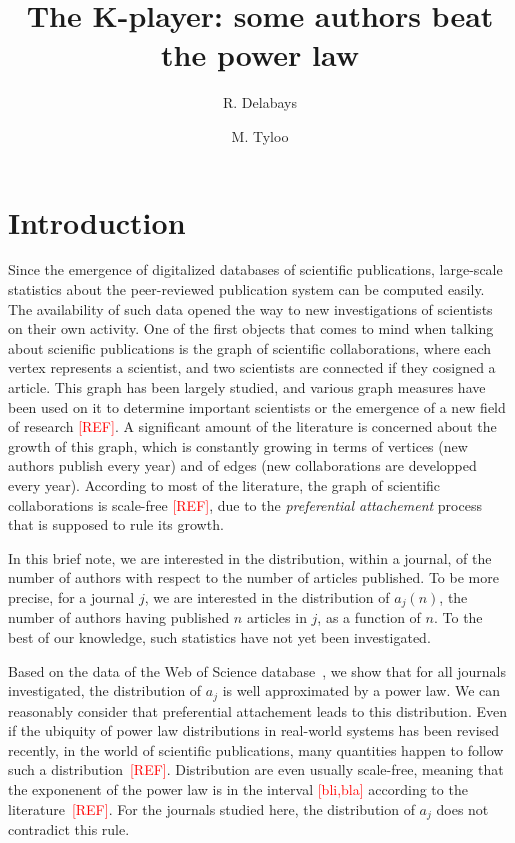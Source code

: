 \documentclass[9pt,twocolumn,twoside]{pnas-new}
\title{The K-player: some authors beat the power law}
\author[a,b,1]{R. Delabays}
\author[a,c]{M. Tyloo}
\affil[a]{School of Engineering, University of Applied Sciences of Western Switzerland HES-SO CH-1951 Sion, Switzerland.}
\affil[b]{Automatic Control Laboratory, Swiss Federal Institute of Technology (ETH) Z\"urich,  Switzerland.}
\affil[c]{Institute of Physics, EPF Lausanne, CH-1015 Lausanne, Switzerland.}
\begin{document}
\maketitle
\thispagestyle{firststyle}

\section{Introduction} 
Since the emergence of digitalized databases of scientific publications, large-scale statistics about the peer-reviewed publication system can be computed easily. 
The availability of such data opened the way to new investigations of scientists on their own activity. 
One of the first objects that comes to mind when talking about scienific publications is the graph of scientific collaborations, 
where each vertex represents a scientist, and two scientists are connected if they cosigned a article. 
This graph has been largely studied, and various graph measures have been used on it to determine important scientists or the emergence of a new field of research \textcolor{red}{[REF]}. 
A significant amount of the literature is concerned about the growth of this graph, which is constantly growing in terms of vertices (new authors publish every year) and of edges 
(new collaborations are developped every year). 
According to most of the literature, the graph of scientific collaborations is scale-free \textcolor{red}{[REF]}, due to the \emph{preferential attachement} process 
that is supposed to rule its growth. 

In this brief note, we are interested in the distribution, within a journal, of the number of authors with respect to the number of articles published. 
To be more precise, for a journal $j$, we are interested in the distribution of $a_j(n)$, the number of authors having published $n$ articles in $j$, as a function of $n$. 
To the best of our knowledge, such statistics have not yet been investigated. 

Based on the data of the Web of Science database~\cite{WoS}, we show that for all journals investigated, the distribution of $a_j$ is well approximated by a power law. 
We can reasonably consider that preferential attachement leads to this distribution. 
Even if the ubiquity of power law distributions in real-world systems has been revised recently\cite{Bro18}, in the world of scientific publications, 
many quantities happen to follow such a distribution~\textcolor{red}{[REF]}.
Distribution are even usually scale-free, meaning that the exponenent of the power law is in the interval \textcolor{red}{[bli,bla]} according to the literature~\textcolor{red}{[REF]}. 
For the journals studied here, the distribution of $a_j$ does not contradict this rule. 
\end{document}
